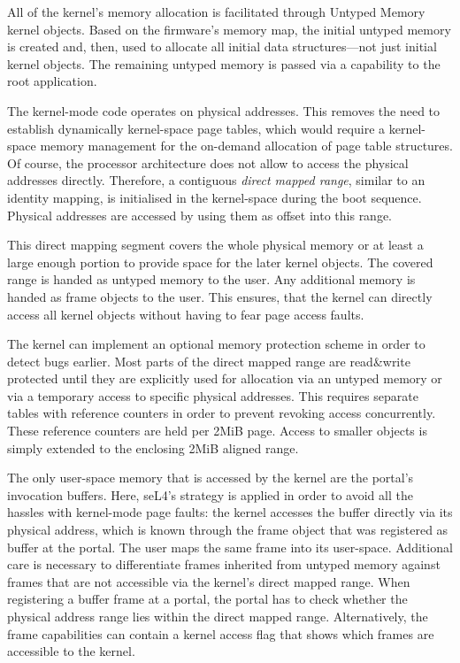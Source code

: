 All of the kernel's memory allocation is facilitated through Untyped Memory kernel objects. Based on the firmware's memory map, the initial untyped memory is created and, then, used to allocate all initial data structures---not just initial kernel objects. The remaining untyped memory is passed via a capability to the root application.

The kernel-mode code operates on physical addresses. This removes the need to establish dynamically kernel-space page tables, which would require a kernel-space memory management for the on-demand allocation of page table structures. Of course, the processor architecture does not allow to access the physical addresses directly. Therefore, a contiguous \emph{direct mapped range}, similar to an identity mapping, is initialised in the kernel-space during the boot sequence. Physical addresses are accessed by using them as offset into this range.

This direct mapping segment covers the whole physical memory or at least a large enough portion to provide space for the later kernel objects. The covered range is handed as untyped memory to the user. Any additional memory is handed as frame objects to the user. This ensures, that the kernel can directly access all kernel objects without having to fear page access faults.

The kernel can implement an optional memory protection scheme in order to detect bugs earlier. Most parts of the direct mapped range are read\&write protected until they are explicitly used for allocation via an untyped memory or via a temporary access to specific physical addresses. This requires separate tables with reference counters in order to prevent revoking access concurrently. These reference counters are held per 2MiB page. Access to smaller objects is simply extended to the enclosing 2MiB aligned range.

The only user-space memory that is accessed by the kernel are the portal's invocation buffers. Here, seL4's strategy is applied in order to avoid all the hassles with kernel-mode page faults: the kernel accesses the buffer directly via its physical address, which is known through the frame object that was registered as buffer at the portal. The user maps the same frame into its user-space. Additional care is necessary to differentiate frames inherited from untyped memory against frames that are not accessible via the kernel's direct mapped range. When registering a buffer frame at a portal, the portal has to check whether the physical address range lies within the direct mapped range. Alternatively, the frame capabilities can contain a kernel access flag that shows which frames are accessible to the kernel.


